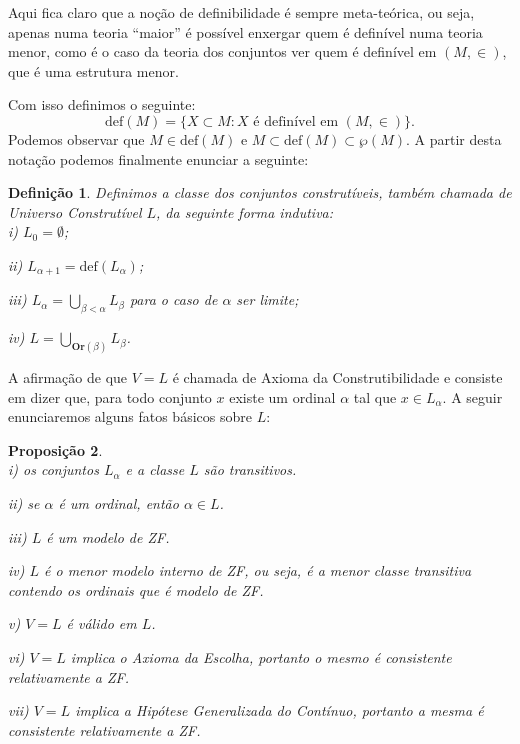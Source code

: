 \documentclass[11pt,a4paper]{article}
\newtheorem{mydef}{Definição}[section]
\newtheorem{prop}[mydef]{Proposição}
\theoremstyle{definition}
\begin{document}
Aqui fica claro que a noção de definibilidade é sempre meta-teórica, ou seja, apenas numa teoria ``maior'' é possível enxergar quem é definível numa teoria menor, como é o caso da teoria dos conjuntos ver quem é definível em $(M,\in)$, que é uma estrutura menor. 

Com isso definimos o seguinte: $$\text{def}(M)=\{ X\subset M : X \text{ é definível em } (M,\in) \}.$$ Podemos observar que $M\in \text{def}(M)$ e $M\subset \text{def}(M) \subset \wp (M)$. A partir desta notação podemos finalmente enunciar a seguinte: 

\begin{mydef}
    
    Definimos a classe dos conjuntos construtíveis, também chamada de Universo Construtível $L$, da seguinte forma indutiva: \\
    
    i) $L_0=\emptyset$;
    
    ii) $L_{\alpha+1}=\text{def}(L_\alpha)$; 
    
    iii) $L_{\alpha} =\displaystyle\bigcup _{\beta < \alpha} L_\beta$ para o caso de $\alpha$ ser limite;
    
    iv) $L=\displaystyle\bigcup _{\textbf{Or}(\beta) } L_\beta$.
    
    
\end{mydef}


A afirmação de que $V=L$ é chamada de Axioma da Construtibilidade e consiste em dizer que, para todo conjunto $x$ existe um ordinal $\alpha$ tal que $x\in L_\alpha$. A seguir enunciaremos alguns fatos básicos sobre $L$:

\begin{prop} 

    \ \\
    
    i) os conjuntos $L_\alpha$ e a classe $L$ são transitivos.
    
    ii) se $\alpha$ é um ordinal, então $\alpha \in L$.
    
    iii) $L$ é um modelo de ZF.
    
    iv) $L$ é o menor modelo interno de ZF, ou seja, é a menor classe transitiva contendo os ordinais que é modelo de ZF.
    
    v) $V=L$ é válido em $L$.
    
    vi) $V=L$ implica o Axioma da Escolha, portanto o mesmo é consistente relativamente a ZF. 
    
    vii) $V=L$ implica a Hipótese Generalizada do Contínuo, portanto a mesma é consistente relativamente a ZF.
    
\end{prop}
\end{document}
